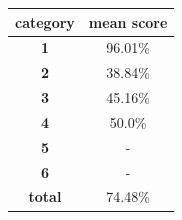 \documentclass[c]{beamer}
\begin{document}
\begin{frame}
\begin{columns}
\begin{column}{0.5\textwidth}
\begin{overlayarea}{\linewidth}{2cm}
\begin{table}
\begin{center}
\begin{adjustbox}{max width=0.4\textwidth}
{\begin{tabular}{|c|c|}
      \hline
      \textbf{category} & \textbf{mean score}\\
      \hline
      \textbf{1} & 96.01\% \\
      \hline
      \textbf{2} & 38.84\% \\
      \hline
      \textbf{3} & 45.16\% \\
      \hline
      \textbf{4} & 50.0\% \\
      \hline
      \textbf{5} & - \\
      \hline
      \textbf{6} & - \\
      \hline
      \textbf{total} & 74.48\% \\
      \hline
    \end{tabular}
    }
    \end{adjustbox}
    \end{center}
  \end{table}
  \end{overlayarea}
\end{column}
\end{columns}
\end{frame}


\end{document}
